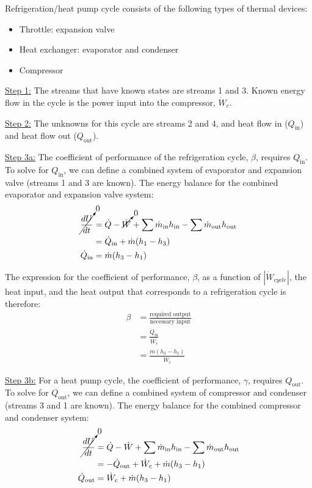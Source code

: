 Refrigeration/heat pump cycle consists of the following types of thermal devices:
\begin{itemize}
    \item Throttle: expansion valve
    \item Heat exchanger: evaporator and condenser
    \item Compressor
\end{itemize}

\underline{Step 1:} The streams that have known states are streams 1 and 3. Known energy flow in the cycle is the power input into the compressor, $\dot{W}_c$.

\hfill

\underline{Step 2:} The unknowns for this cycle are streams 2 and 4, and heat flow in ($Q_\text{in}$) and heat flow out ($Q_\text{out}$).

\hfill

\underline{Step 3a:} The coefficient of performance of the refrigeration cycle, $\beta$, requires $Q_\text{in}$. To solve for $Q_\text{in}$, we can define a combined system of evaporator and expansion valve (streams 1 and 3 are known). The energy balance for the combined evaporator and expansion valve system:
\begin{align*}
\cancelto{0}{\frac{dU}{dt}} &= \dot{Q} - \cancelto{0}{\dot{W}} + \sum \dot{m}_\text{in} h_\text{in} - \sum \dot{m}_\text{out} h_\text{out} \\
&= \dot{Q}_\text{in} + \dot{m} (h_\text{1} - h_\text{3}) \\
\dot{Q}_\text{in} &= \dot{m} (h_\text{3} - h_\text{1})
\end{align*}

The expression for the coefficient of performance, $\beta$, as a function of $|\dot{W}_{cycle}|$, the heat input, and the heat output that corresponds to a refrigeration cycle is therefore:
\begin{align*}
\beta &= \frac{\text{required output}}{\text{necessary input}} \\
&= \frac{\dot{Q}_\text{in}}{\dot{W}_c} \\
&= \frac{\dot{m}(h_3-h_1)}{\dot{W}_c}
\end{align*}


\underline{Step 3b:} For a heat pump cycle, the coefficient of performance, $\gamma$, requires $Q_\text{out}$. To solve for $Q_\text{out}$, we can define a combined system of compressor and condenser (streams 3 and 1 are known). The energy balance for the combined compressor and condenser system:
\begin{align*}
\cancelto{0}{\frac{dU}{dt}} &= \dot{Q} - \dot{W} + \sum \dot{m}_\text{in} h_\text{in} - \sum \dot{m}_\text{out} h_\text{out} \\
&= - \dot{Q}_\text{out} + \dot{W}_c + \dot{m} (h_\text{3} - h_\text{1}) \\
\dot{Q}_\text{out} &= \dot{W}_c + \dot{m} (h_\text{3} - h_\text{1})
\end{align*}

